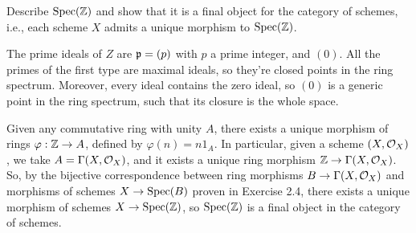 \begin{ex}
	Describe $\mathrm{Spec}(\mathbb{Z})$ and show that it is a final object for the category of schemes, i.e., each scheme $X$ admits a unique morphism to $\mathrm{Spec}(\mathbb{Z})$.
\end{ex}

\begin{sol}
	The prime ideals of $Z$ are $\mathfrak{p} = (p)$ with $p$ a prime integer, and $(0)$. All the primes of the first type are maximal ideals, so they're closed points in the ring spectrum. Moreover, every ideal contains the zero ideal, so $(0)$ is a generic point in the ring spectrum, such that its closure is the whole space.

	Given any commutative ring with unity $A$, there exists a unique morphism of rings $\varphi: \mathbb{Z} \to A$, defined by $\varphi(n) = n 1_{A}$. In particular, given a scheme $(X, \mathcal{O}_X)$, we take $A = \Gamma(X,\mathcal{O}_X)$, and it exists a unique ring morphism $\mathbb{Z} \to \Gamma(X, \mathcal{O}_X)$. So, by the bijective correspondence between ring morphisms $B \to \Gamma(X, \mathcal{O}_X)$ and morphisms of schemes $X \to \mathrm{Spec}(B)$ proven in Exercise 2.4, there exists a unique morphism of schemes $X \to \mathrm{Spec}(\mathbb{Z})$, so $\mathrm{Spec}(\mathbb{Z})$ is a final object in the category of schemes.
\end{sol}